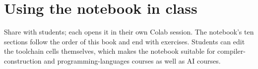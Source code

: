\section{Using the notebook in class}

Share  with students; each opens it in their own Colab session. The notebook's ten sections follow the order of this book and end with exercises. Students can edit the toolchain cells themselves, which makes the notebook suitable for compiler-construction and programming-languages courses as well as AI courses.
